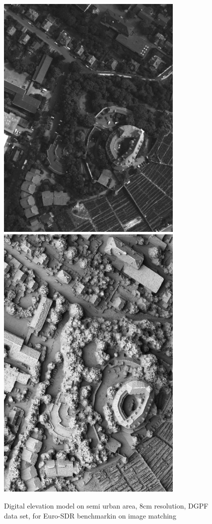 \begin{figure}
\includegraphics[width=90mm]{FIGS/SAMPLES/DGPF_8Bits.jpg}
\includegraphics[width=90mm]{FIGS/SAMPLES/DGF-SHADE.jpg}
\caption{Digital elevation model on semi urban area, 8cm resolution, DGPF data set, for
Euro-SDR benchmarkin on image matching}
\end{figure}

